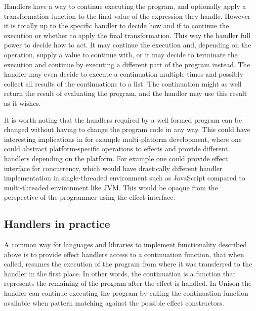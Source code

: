 Handlers have a way to continue executing the program, and optionally apply a transformation function to the final value of the expression they handle. However it is totally up to the specific handler to decide how and if to continue the execution or whether to apply the final transformation. This way the handler full power to decide how to act. It may continue the execution and, depending on the operation, supply a value to continue with, or it may decide to terminate the execution and continue by executing a different part of the program instead. The handler may even decide to execute a continuation multiple times and possibly collect all results of the continuations to a list. The continuation might as well return the result of evaluating the program, and the handler may use this result as it wishes.

It is worth noting that the handlers required by a well formed program can be changed without having to change the program code in any way. This could have interesting implications in for example multi-platform development, where one could abstract platform-specific operations to effects and provide different handlers depending on the platform. For example one could provide effect interface for concurrency, which would have drastically different handler implementation in single-threaded environment such as JavaScript compared to multi-threaded environment like JVM. This would be opaque from the perspective of the programmer using the effect interface.



\subsection{Handlers in practice}
A common way for languages and libraries to implement functionality described above is to provide effect handlers access to a continuation function, that when called, resumes the execution of the program from where it was transferred to the handler in the first place. In other words, the continuation is a function that represents the remaining of the program after the effect is handled. In Unison the handler can continue executing the program by calling the continuation function available when pattern matching against the possible effect constructors.

